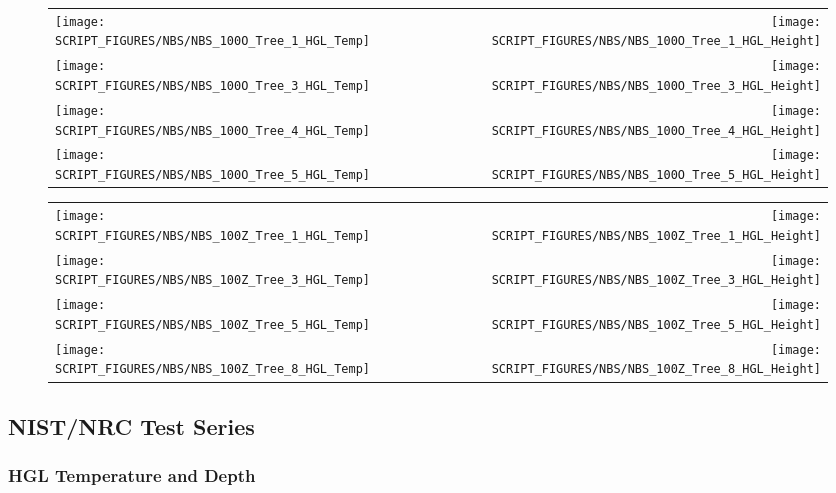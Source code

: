 \begin{figure}[!ht]
\begin{tabular*}{\textwidth}{l@{\extracolsep{\fill}}r}
\texttt{[image: SCRIPT\_FIGURES/NBS/NBS\_100O\_Tree\_1\_HGL\_Temp]} &
\texttt{[image: SCRIPT\_FIGURES/NBS/NBS\_100O\_Tree\_1\_HGL\_Height]} \\
\texttt{[image: SCRIPT\_FIGURES/NBS/NBS\_100O\_Tree\_3\_HGL\_Temp]} &
\texttt{[image: SCRIPT\_FIGURES/NBS/NBS\_100O\_Tree\_3\_HGL\_Height]} \\
\texttt{[image: SCRIPT\_FIGURES/NBS/NBS\_100O\_Tree\_4\_HGL\_Temp]} &
\texttt{[image: SCRIPT\_FIGURES/NBS/NBS\_100O\_Tree\_4\_HGL\_Height]} \\
\texttt{[image: SCRIPT\_FIGURES/NBS/NBS\_100O\_Tree\_5\_HGL\_Temp]} &
\texttt{[image: SCRIPT\_FIGURES/NBS/NBS\_100O\_Tree\_5\_HGL\_Height]}
\end{tabular*}
\end{figure}

\begin{figure}[!ht]
\begin{tabular*}{\textwidth}{l@{\extracolsep{\fill}}r}
\texttt{[image: SCRIPT\_FIGURES/NBS/NBS\_100Z\_Tree\_1\_HGL\_Temp]} &
\texttt{[image: SCRIPT\_FIGURES/NBS/NBS\_100Z\_Tree\_1\_HGL\_Height]} \\
\texttt{[image: SCRIPT\_FIGURES/NBS/NBS\_100Z\_Tree\_3\_HGL\_Temp]} &
\texttt{[image: SCRIPT\_FIGURES/NBS/NBS\_100Z\_Tree\_3\_HGL\_Height]} \\
\texttt{[image: SCRIPT\_FIGURES/NBS/NBS\_100Z\_Tree\_5\_HGL\_Temp]} &
\texttt{[image: SCRIPT\_FIGURES/NBS/NBS\_100Z\_Tree\_5\_HGL\_Height]} \\
\texttt{[image: SCRIPT\_FIGURES/NBS/NBS\_100Z\_Tree\_8\_HGL\_Temp]} &
\texttt{[image: SCRIPT\_FIGURES/NBS/NBS\_100Z\_Tree\_8\_HGL\_Height]}
\end{tabular*}
\end{figure}

\clearpage

\subsection{NIST/NRC Test Series}

\subsubsection{HGL Temperature and Depth}

